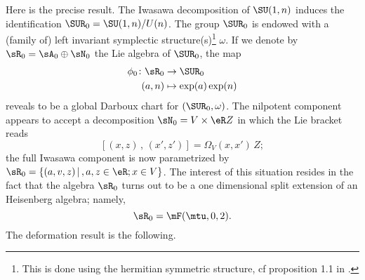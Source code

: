 Here is the precise result. The Iwasawa decomposition of $\SU(1,n)$ induces the identification $\SUR_0=\SU(1,n)/U(n)$. The group $\SUR_0$ is endowed with a (family of) left invariant symplectic structure(s)\footnote{This is done using the hermitian symmetric structure, cf proposition 1.1 in \cite{Biel-Massar}.} $\omega$.  If we denote by $\sR_0=\sA_0\oplus\sN_0$ the Lie algebra of $\SUR_0$, the map
\begin{equation}  \label{DARBOUX}
\begin{aligned}
 \phi_0\colon \sR_0&\to \SUR_0 \\ 
(a,n)&\mapsto \exp(a)\exp(n) 
\end{aligned}
\end{equation}
reveals to be a global Darboux chart for $(\SUR_0,\omega)$.  The nilpotent component appears to accept a decomposition $\sN_0=V\times\eR Z$ in which the Lie bracket reads
\[ 
[(x,z)\,,\,(x',z')]=\Omega_V(x,x')\,Z; 
\]
the full Iwasawa component is now parametrized by $\sR_0=\{(a,v,z)\,|\,,a,z\in\eR;x\in V\}$. The interest of this situation resides in the fact that the algebra $\sR_0$ turns out to be a one dimensional split extension of an Heisenberg algebra; namely, 
\[ 
\sR_0=\mF(\mtu,0,2).
\]
The deformation result is the following.

